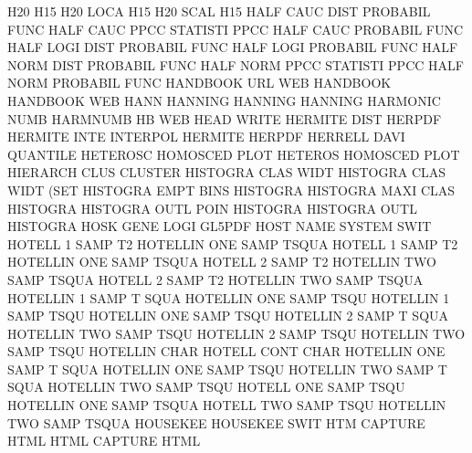 H20                                     H15
H20      LOCA                           H15
H20      SCAL                           H15
HALF     CAUC DIST                      PROBABIL FUNC
HALF     CAUC PPCC                      STATISTI PPCC
HALF     CAUC                           PROBABIL FUNC
HALF     LOGI DIST                      PROBABIL FUNC
HALF     LOGI                           PROBABIL FUNC
HALF     NORM DIST                      PROBABIL FUNC
HALF     NORM PPCC                      STATISTI PPCC
HALF     NORM                           PROBABIL FUNC
HANDBOOK URL                            WEB      HANDBOOK
HANDBOOK                                WEB
HANN                                    HANNING
HANNING                                 HANNING
HARMONIC NUMB                           HARMNUMB
HB                                      WEB
HEAD                                    WRITE
HERMITE  DIST                           HERPDF
HERMITE  INTE                           INTERPOL
HERMITE                                 HERPDF
HERRELL  DAVI                           QUANTILE
HETEROSC                                HOMOSCED PLOT
HETEROS                                 HOMOSCED PLOT
HIERARCH CLUS                           CLUSTER
HISTOGRA CLAS WIDT                      HISTOGRA CLAS WIDT (SET
HISTOGRA EMPT BINS                      HISTOGRA
HISTOGRA MAXI CLAS                      HISTOGRA
HISTOGRA OUTL POIN                      HISTOGRA
HISTOGRA OUTL                           HISTOGRA
HOSK     GENE LOGI                      GL5PDF
HOST     NAME                           SYSTEM   SWIT
HOTELL   1    SAMP T2                   HOTELLIN ONE  SAMP TSQUA
HOTELL   1    SAMP T2                   HOTELLIN ONE  SAMP TSQUA
HOTELL   2    SAMP T2                   HOTELLIN TWO  SAMP TSQUA
HOTELL   2    SAMP T2                   HOTELLIN TWO  SAMP TSQUA
HOTELLIN 1    SAMP T    SQUA            HOTELLIN ONE  SAMP TSQU
HOTELLIN 1    SAMP TSQU                 HOTELLIN ONE  SAMP TSQU
HOTELLIN 2    SAMP T    SQUA            HOTELLIN TWO  SAMP TSQU
HOTELLIN 2    SAMP TSQU                 HOTELLIN TWO  SAMP TSQU
HOTELLIN CHAR                           HOTELL   CONT CHAR
HOTELLIN ONE  SAMP T    SQUA            HOTELLIN ONE  SAMP TSQU
HOTELLIN TWO  SAMP T    SQUA            HOTELLIN TWO  SAMP TSQU
HOTELL   ONE  SAMP TSQU                 HOTELLIN ONE  SAMP TSQUA
HOTELL   TWO  SAMP TSQU                 HOTELLIN TWO  SAMP TSQUA
HOUSEKEE                                HOUSEKEE SWIT
HTM                                     CAPTURE  HTML
HTML                                    CAPTURE  HTML
